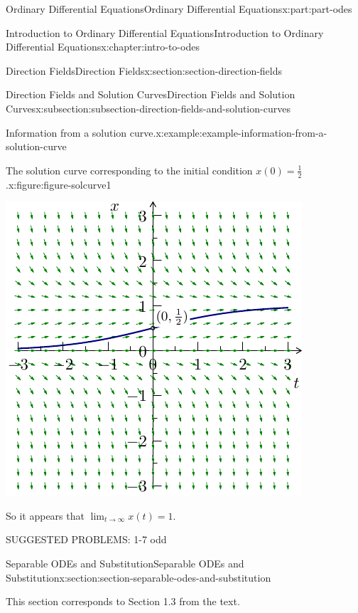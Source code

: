 \documentclass[oneside,10pt,]{book}
\numberwithin{equation}{part}
\begin{document}
\begin{partptx}{Ordinary Differential Equations}{}{Ordinary Differential Equations}{}{}{x:part:part-odes}
\begin{chapterptx}{Introduction to Ordinary Differential Equations}{}{Introduction to Ordinary Differential Equations}{}{}{x:chapter:intro-to-odes}
\begin{sectionptx}{Direction Fields}{}{Direction Fields}{}{}{x:section:section-direction-fields}
\begin{subsectionptx}{Direction Fields and Solution Curves}{}{Direction Fields and Solution Curves}{}{}{x:subsection:subsection-direction-fields-and-solution-curves}
\begin{example}{Information from a solution curve.}{x:example:example-information-from-a-solution-curve}
\begin{figureptx}{The solution curve corresponding to the initial condition \(x(0) = \frac{1}{2}\).}{x:figure:figure-solcurve1}{}
\begin{image}{0.25}{0.5}{0.25}
\includegraphics[width=\linewidth]{generated/asymptote/image-5.pdf}
\end{image}%
\tcblower
\end{figureptx}%
So it appears that \(\lim_{t\to\infty}x(t) = 1\).%
\end{example}
\end{subsectionptx}
\begin{conclusion}{}%
SUGGESTED PROBLEMS: 1-7 odd%
\end{conclusion}%
\end{sectionptx}
%
%
\typeout{************************************************}
\typeout{************************************************}
%
\begin{sectionptx}{Separable ODEs and Substitution}{}{Separable ODEs and Substitution}{}{}{x:section:section-separable-odes-and-substitution}
\begin{introduction}{}%
This section corresponds to Section 1.3 from the text.%
\end{introduction}%
%
%
\typeout{************************************************}
\typeout{************************************************}
%

\end{sectionptx}
\end{chapterptx}
\end{partptx}
\end{document}
